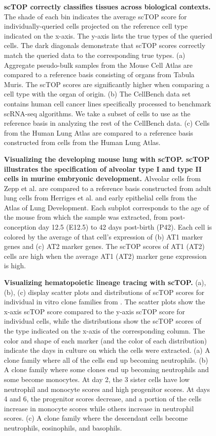 \documentclass[vruler,JEB]{COB}%
\begin{document}
\begin{figure}[h!]
	\centering
	\caption{\textbf{scTOP correctly classifies tissues across biological contexts.} The shade of each bin indicates the average scTOP score for individually-queried cells projected on the reference cell type indicated on the x-axis. The y-axis lists the true types of the queried cells. The dark diagonals demonstrate that scTOP scores correctly match the queried data to the corresponding true types.  (a) Aggregate pseudo-bulk samples from the Mouse Cell Atlas are compared to a reference basis consisting of organs from Tabula Muris. The scTOP scores are significantly higher when comparing a cell type with the organ of origin. (b) The CellBench data set contains human cell cancer lines specifically processed to benchmark scRNA-seq algorithms. We take a subset of cells to use as the reference basis in analyzing the rest of the CellBench data. (c) Cells from the Human Lung Atlas are compared to a reference basis constructed from cells from the Human Lung Atlas. }
	\label{heatmaps}
\end{figure}

\begin{figure}[h!]
	\centering
	\caption{\textbf{Visualizing the developing mouse lung with scTOP. scTOP illustrates the specification of alveolar type I and type II cells in murine embryonic development.} Alveolar cells from Zepp et al. are compared to a reference basis constructed from adult lung cells from Herriges et al. and early epithelial cells from the Atlas of Lung Development. Each subplot corresponds to the age of the mouse from which the sample was extracted, from post-conception day 12.5 (E12.5) to 42 days post-birth (P42). Each cell is colored by the average of that cell's expression of (b) AT1 marker genes and (c) AT2 marker genes. The scTOP scores of AT1 (AT2) cells are high when the average AT1 (AT2) marker gene expression is high.}
	\label{LungMAP}
\end{figure}

\begin{figure}[h!]
	\centering
	\caption{\textbf{Visualizing hematopoietic lineage tracing with scTOP.} (a), (b), (c) display scatter plots and distributions of scTOP scores for individual in vitro clone families from  \cite{weinreb_lineage_2020}. The scatter plots show the x-axis scTOP score compared to the y-axis scTOP score for individual cells, while the distributions show the scTOP scores of the type indicated on the x-axis of the corresponding column. The color and shape of each marker (and the color of each distribution) indicate the days in culture on which the cells were extracted. (a) A clone family where all of the cells end up becoming neutrophils. (b) A clone family where some clones end up becoming neutrophils and some become monocytes. At day 2, the 3 sister cells have low neutrophil and monocyte scores and high progenitor scores. At days 4 and 6, the progenitor scores decrease, and a portion of the cells increase in monocyte scores while others increase in neutrophil scores. (c) A clone family where the descendant cells become neutrophils, eosinophils, and basophils.}
	\label{hem clones}
\end{figure}
\end{document}
